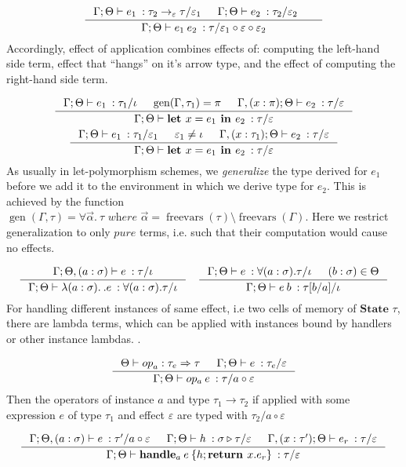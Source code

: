 \documentclass[declaration,shortabstract]{iithesis}
\theoremstyle{definition} \newtheorem{definition}{Definition}[section]
\newcommand{\types}[4][\Gamma;\Theta]{\ensuremath{{{#1} \vdash {#2} \: : {#3}/{#4}}}}
\newcommand{\arrow}[3]{{#1}\rightarrow_{#2}{#3}}
\newcommand{\lam}[1][x]{\ensuremath{\lambda #1.\:}}
\newcommand{\optypes}[5][\Theta]{\ensuremath{{#1}\vdash{#2}_{#3} : {#4} \Rightarrow {#5}}}
\newcommand{\ops}[2]{\optypes{op}{a}{#1}{#2}}
\begin{document}
$$
\inference{
    \types{e_1}{\arrow{\tau_2}{\varepsilon}{\tau}}{\varepsilon_1} &
    \types{e_2}{\tau_2}{\varepsilon_2} &
}{
    \types{e_1\:e_2}{\tau}{\varepsilon_1 \circ \varepsilon \circ \varepsilon_2}
}
$$
Accordingly, effect of application combines effects of: computing the left-hand side term,
effect that ``hangs'' on it's arrow type, and the effect of computing the right-hand side term.

\begin{gather*}
\begin{gathered}
\inference{
    \types{e_1}{\tau_1}{\iota} &
    \operatorname{gen}(\Gamma, \tau_1) = \pi &
    \types[\Gamma,(x:\pi);\Theta]{e_2}{\tau}{\varepsilon}
}{
    \types{\textbf{let } x = e_1 \textbf{ in } e_2}{\tau}{\varepsilon}
}
\\
\inference{
    \types{e_1}{\tau_1}{\varepsilon_1} & 
    \varepsilon_1 \neq \iota & 
    \types[\Gamma,(x:\tau_1);\Theta]{e_2}{\tau}{\varepsilon}
}{
    \types{\textbf{let } x = e_1 \textbf{ in } e_2}{\tau}{\varepsilon}
}
\end{gathered}
\end{gather*}
As usually in let-polymorphism schemes, we \textit{generalize} the type derived for $e_1$ before
we add it to the environment in which we derive type for $e_2$.
This is achieved by the function
$\operatorname{gen}(\Gamma, \tau) = \forall \vec\alpha.\:\tau \textit{ where }
\vec\alpha = \operatorname{freevars}(\tau) \setminus \operatorname{freevars}(\Gamma)$.
Here we restrict generalization to only $pure$ terms,
i.e. such that their computation would cause no effects.

$$
\inference{
    \types[\Gamma; \Theta, (a : \sigma)]{e}{\tau}{\iota}
}{
    \types{\lam[(a : \sigma)]. e}{\forall (a : \sigma) . \tau}{\iota}
}
\quad
\inference{
    \types{e}{\forall (a : \sigma) . \tau}{\iota} & (b:\sigma) \in \Theta
}{
    \types{e\:b}{\tau[b/a]}{\iota}
}
$$
For handling different instances of same effect, i.e two cells of memory of $\textbf{State }\tau$,
there are lambda terms, which can be applied with instances bound by handlers or other instance lambdas.
.

$$
\inference{
    \ops{\tau_e}{\tau} &
    \types{e}{\tau_e}{\varepsilon} 
}{
    \types{op_a \: e}{\tau}{a \circ \varepsilon}
}
$$
Then the operators of instance $a$ and type $\tau_1 \rightarrow \tau_2$ if applied with
some expression $e$ of type $\tau_1$ and effect $\varepsilon$ are typed with $\tau_2 /{ a \circ \varepsilon}$ 

$$
 \inference{
    \types[\Gamma;\Theta,(a:\sigma)]{e}{\tau'}{a \circ \varepsilon} &
    \types{h}{\sigma \triangleright \tau}{\varepsilon} &
    \types[\Gamma,(x:\tau');\Theta]{e_r}{\tau}{\varepsilon}
}{
    \types{\textbf{handle}_a \: e\: \{h;\textbf{return } x. e_r\}}{\tau}{\varepsilon}
}
$$
\end{document}
